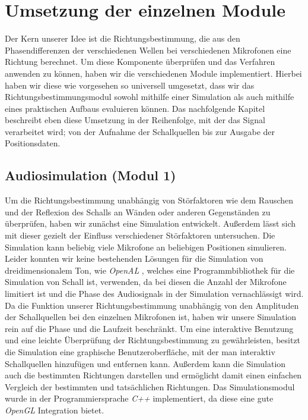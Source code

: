 \section{Umsetzung der einzelnen Module}
Der Kern unserer Idee ist die Richtungsbestimmung, die aus den Phasendifferenzen der verschiedenen Wellen bei verschiedenen Mikrofonen eine Richtung berechnet. Um diese Komponente überprüfen und das Verfahren anwenden zu können, haben wir die verschiedenen Module implementiert. Hierbei haben wir diese wie vorgesehen so universell umgesetzt, dass wir das Richtungsbestimmungsmodul sowohl mithilfe einer Simulation als auch mithilfe eines praktischen Aufbaus evaluieren können. Das nachfolgende Kapitel beschreibt eben diese Umsetzung in der Reihenfolge, mit der das Signal verarbeitet wird; von der Aufnahme der Schallquellen bis zur Ausgabe der Positionsdaten.

\subsection{Audiosimulation (Modul 1)}
Um die Richtungsbestimmung unabhängig von Störfaktoren wie dem Rauschen und der Reflexion des Schalls an Wänden oder anderen Gegenständen zu überprüfen, haben wir zunächst eine Simulation entwickelt. Außerdem lässt sich mit dieser gezielt der Einfluss verschiedener Störfaktoren untersuchen. Die Simulation kann beliebig viele Mikrofone an beliebigen Positionen simulieren. Leider konnten wir keine bestehenden Lösungen für die Simulation von dreidimensionalem Ton, wie \textit{OpenAL} \cite{OpenAL}, welches eine Programmbibliothek für die Simulation von Schall ist, verwenden, da bei diesen die Anzahl der Mikrofone limitiert ist und die Phase des Audiosignals in der Simulation vernachlässigt wird. Da die Funktion unserer Richtungsbestimmung unabhängig von den Amplituden der Schallquellen bei den einzelnen Mikrofonen ist, haben wir unsere Simulation rein auf die Phase und die Laufzeit beschränkt. Um eine interaktive Benutzung und eine leichte Überprüfung der Richtungsbestimmung zu gewährleisten, besitzt die Simulation eine graphische Benutzeroberfläche, mit der man interaktiv Schallquellen hinzufügen und entfernen kann. Außerdem kann die Simulation auch die bestimmten Richtungen darstellen und ermöglicht damit einen einfachen Vergleich der bestimmten und tatsächlichen Richtungen. Das Simulationsmodul wurde in der Programmiersprache \textit{C++} implementiert, da diese eine gute \textit{OpenGL} Integration bietet.

